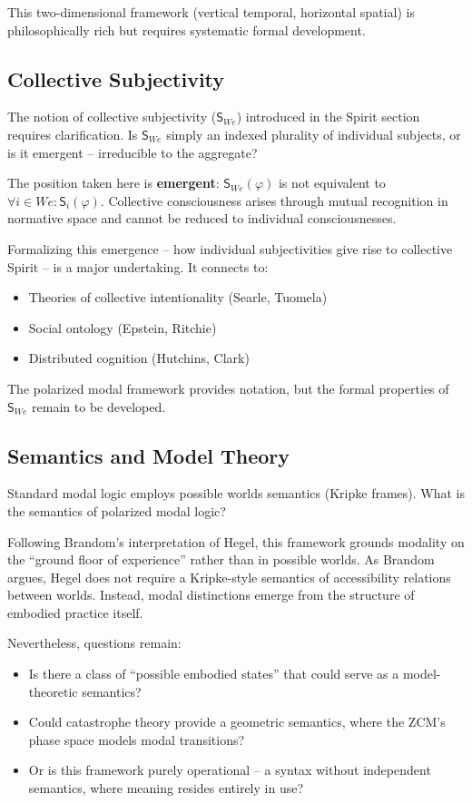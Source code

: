 \documentclass[12pt]{book}
\begin{document}
This two-dimensional framework (vertical temporal, horizontal spatial) is philosophically rich but requires systematic formal development.

\subsection{Collective Subjectivity}

The notion of collective subjectivity ($\mathsf{S}_{We}$) introduced in the Spirit section requires clarification. Is $\mathsf{S}_{We}$ simply an indexed plurality of individual subjects, or is it emergent -- irreducible to the aggregate?

The position taken here is \textbf{emergent}: $\mathsf{S}_{We}(\varphi)$ is not equivalent to $\forall i \in We: \mathsf{S}_i(\varphi)$. Collective consciousness arises through mutual recognition in normative space and cannot be reduced to individual consciousnesses.

Formalizing this emergence -- how individual subjectivities give rise to collective Spirit -- is a major undertaking. It connects to:
\begin{itemize}
\item Theories of collective intentionality (Searle, Tuomela)
\item Social ontology (Epstein, Ritchie)
\item Distributed cognition (Hutchins, Clark)
\end{itemize}

The polarized modal framework provides notation, but the formal properties of $\mathsf{S}_{We}$ remain to be developed.

\subsection{Semantics and Model Theory}

Standard modal logic employs possible worlds semantics (Kripke frames). What is the semantics of polarized modal logic?

Following Brandom's interpretation of Hegel, this framework grounds modality on the ``ground floor of experience'' rather than in possible worlds. As Brandom argues, Hegel does not require a Kripke-style semantics of accessibility relations between worlds. Instead, modal distinctions emerge from the structure of embodied practice itself.

Nevertheless, questions remain:
\begin{itemize}
\item Is there a class of ``possible embodied states'' that could serve as a model-theoretic semantics?
\item Could catastrophe theory provide a geometric semantics, where the ZCM's phase space models modal transitions?
\item Or is this framework purely operational -- a syntax without independent semantics, where meaning resides entirely in use?
\end{itemize}
\end{document}
